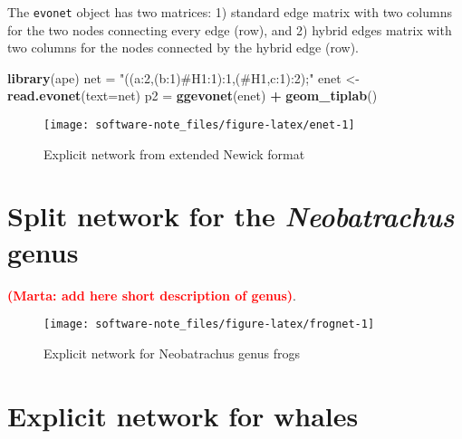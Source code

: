 \documentclass[]{IEEEtran}
\newenvironment{Shaded}{\begin{snugshade}}{\end{snugshade}}
\newcommand{\DataTypeTok}[1]{\textcolor[rgb]{0.13,0.29,0.53}{#1}}
\newcommand{\KeywordTok}[1]{\textcolor[rgb]{0.13,0.29,0.53}{\textbf{#1}}}
\newcommand{\NormalTok}[1]{#1}
\newcommand{\OperatorTok}[1]{\textcolor[rgb]{0.81,0.36,0.00}{\textbf{#1}}}
\newcommand{\StringTok}[1]{\textcolor[rgb]{0.31,0.60,0.02}{#1}}
\begin{document}
The \texttt{evonet} object has two matrices: 1) standard edge matrix
with two columns for the two nodes connecting every edge (row), and 2)
hybrid edges matrix with two columns for the nodes connected by the
hybrid edge (row).

\begin{Shaded}
\begin{Highlighting}[]
\KeywordTok{library}\NormalTok{(ape)}
\NormalTok{net =}\StringTok{ "((a:2,(b:1)#H1:1):1,(#H1,c:1):2);"}
\NormalTok{enet <-}\StringTok{ }\KeywordTok{read.evonet}\NormalTok{(}\DataTypeTok{text=}\NormalTok{net)}
\NormalTok{p2 =}\StringTok{ }\KeywordTok{ggevonet}\NormalTok{(enet) }\OperatorTok{+}\StringTok{ }\KeywordTok{geom_tiplab}\NormalTok{() }
\end{Highlighting}
\end{Shaded}

\begin{figure}[H]

{\centering \texttt{[image: software-note\_files/figure-latex/enet-1]} 

}

\caption{Explicit network from extended Newick format}\label{fig:enet}
\end{figure}

\hypertarget{split-network-for-the-neobatrachus-genus}{%
\section{\texorpdfstring{Split network for the \emph{Neobatrachus}
genus}{Split network for the Neobatrachus genus}}\label{split-network-for-the-neobatrachus-genus}}

\textcolor{red}{\textbf{(Marta: add here short description of genus)}}.

\begin{figure}[H]

{\centering \texttt{[image: software-note\_files/figure-latex/frognet-1]} 

}

\caption{Explicit network for Neobatrachus genus frogs}\label{fig:frognet}
\end{figure}

\hypertarget{explicit-network-for-whales}{%
\section{Explicit network for
whales}\label{explicit-network-for-whales}}
\end{document}
